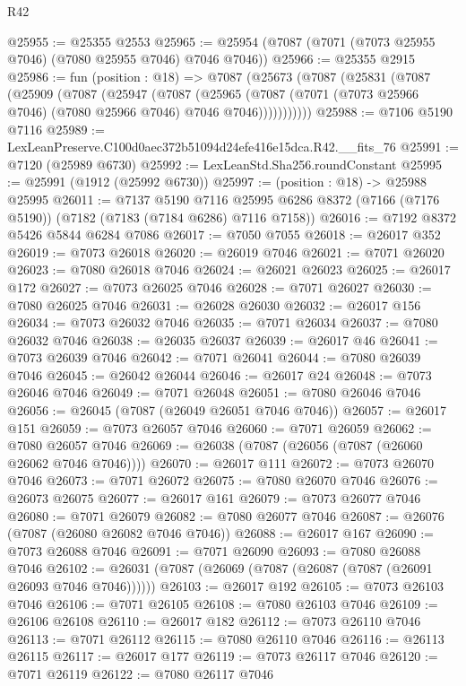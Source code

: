 \begin{lexlean}{R42}
\begin{coremodule}
{@25955 := @25355 @2553
@25965 := @25954 (@7087 (@7071 (@7073 @25955 @7046) (@7080 @25955 @7046) @7046 @7046))
@25966 := @25355 @2915
@25986 := fun (position : @18) =>
  @7087
    (@25673
      (@7087
        (@25831
          (@7087
            (@25909
              (@7087
                (@25947
                  (@7087
                    (@25965
                      (@7087 (@7071 (@7073 @25966 @7046) (@7080 @25966 @7046) @7046 @7046)))))))))))
@25988 := @7106 @5190 @7116
@25989 := LexLeanPreserve.C100d0aec372b51094d24efe416e15dca.R42.__fits_76
@25991 := @7120 (@25989 @6730)
@25992 := LexLeanStd.Sha256.roundConstant
@25995 := @25991 (@1912 (@25992 @6730))
@25997 := (position : @18) -> @25988 @25995
@26011 := @7137
    @5190
    @7116
    @25995
    @6286
    @8372
    (@7166 (@7176 @5190))
    (@7182 (@7183 (@7184 @6286) @7116 @7158))
@26016 := @7192 @8372 @5426 @5844 @6284 @7086
@26017 := @7050 @7055
@26018 := @26017 @352
@26019 := @7073 @26018
@26020 := @26019 @7046
@26021 := @7071 @26020
@26023 := @7080 @26018 @7046
@26024 := @26021 @26023
@26025 := @26017 @172
@26027 := @7073 @26025 @7046
@26028 := @7071 @26027
@26030 := @7080 @26025 @7046
@26031 := @26028 @26030
@26032 := @26017 @156
@26034 := @7073 @26032 @7046
@26035 := @7071 @26034
@26037 := @7080 @26032 @7046
@26038 := @26035 @26037
@26039 := @26017 @46
@26041 := @7073 @26039 @7046
@26042 := @7071 @26041
@26044 := @7080 @26039 @7046
@26045 := @26042 @26044
@26046 := @26017 @24
@26048 := @7073 @26046 @7046
@26049 := @7071 @26048
@26051 := @7080 @26046 @7046
@26056 := @26045 (@7087 (@26049 @26051 @7046 @7046))
@26057 := @26017 @151
@26059 := @7073 @26057 @7046
@26060 := @7071 @26059
@26062 := @7080 @26057 @7046
@26069 := @26038 (@7087 (@26056 (@7087 (@26060 @26062 @7046 @7046))))
@26070 := @26017 @111
@26072 := @7073 @26070 @7046
@26073 := @7071 @26072
@26075 := @7080 @26070 @7046
@26076 := @26073 @26075
@26077 := @26017 @161
@26079 := @7073 @26077 @7046
@26080 := @7071 @26079
@26082 := @7080 @26077 @7046
@26087 := @26076 (@7087 (@26080 @26082 @7046 @7046))
@26088 := @26017 @167
@26090 := @7073 @26088 @7046
@26091 := @7071 @26090
@26093 := @7080 @26088 @7046
@26102 := @26031 (@7087 (@26069 (@7087 (@26087 (@7087 (@26091 @26093 @7046 @7046))))))
@26103 := @26017 @192
@26105 := @7073 @26103 @7046
@26106 := @7071 @26105
@26108 := @7080 @26103 @7046
@26109 := @26106 @26108
@26110 := @26017 @182
@26112 := @7073 @26110 @7046
@26113 := @7071 @26112
@26115 := @7080 @26110 @7046
@26116 := @26113 @26115
@26117 := @26017 @177
@26119 := @7073 @26117 @7046
@26120 := @7071 @26119
@26122 := @7080 @26117 @7046
}
\end{coremodule}
\end{lexlean}
